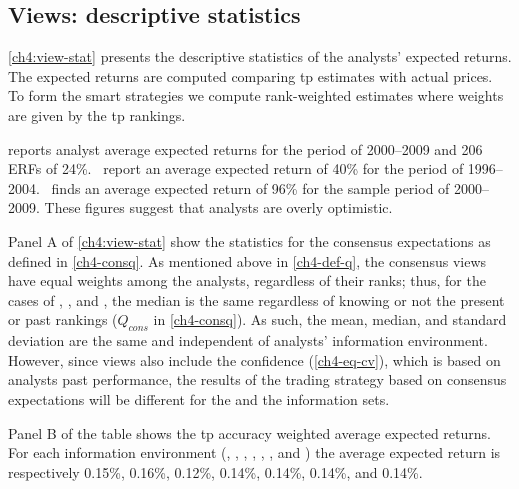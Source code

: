 \documentclass[a4paper,twoside,12pt,openright,notitlepage]{report}\usepackage[]{graphicx}\usepackage[]{color}
\begin{document}
\subsection{Views: descriptive statistics}


\ref{ch4:view-stat} presents the descriptive statistics of the analysts' expected returns. The expected returns  are computed comparing \gls{tp} estimates with actual prices. To form the smart strategies we compute rank-weighted estimates where weights are given  by the \gls{tp} rankings.

\cite{bradshaw2002} reports analyst average expected returns for the period of 2000--2009 and 206 ERFs of 24\%.~\cite{da2011} report an average expected return of 40\% for the period of 1996--2004.~\cite{zhou2013} finds an average expected return of 96\% for the sample period of 2000--2009. These figures suggest that analysts are overly optimistic.

Panel A of \ref{ch4:view-stat} show the statistics for the consensus expectations as defined in \ref{ch4-consq}. As mentioned above in \ref{ch4-def-q}, the consensus views have equal weights among the analysts, regardless of their ranks; thus, for the cases of \tr{}, \naive{}, and , the median is the same regardless of knowing or not the present or past rankings ($Q_{cons}$ in  \ref{ch4-consq}). As such, the mean, median, and standard deviation are the same and independent of analysts' information environment. However, since views also include the confidence (\ref{ch4-eq-cv}), which is based on analysts past performance, the results of the trading strategy based on consensus expectations will be different for the \naive{} and the  information sets.



Panel B of the table shows the \gls{tp} accuracy weighted average expected returns. For each information environment (\tr{}, \naive{}, , \last{}, \diff{}, \random{}, and \rollsd{} ) the average expected return  is respectively 0.15\%, 0.16\%,  0.12\%, 0.14\%, 0.14\%, 0.14\%, and 0.14\%.
\end{document}
